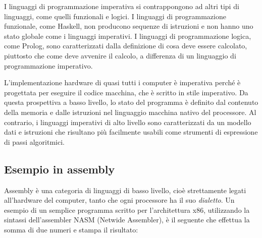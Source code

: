 \documentclass[
  letterpaper,
]{scrbook}
\begin{document}
I linguaggi di programmazione imperativa si contrappongono ad altri tipi
di linguaggi, come quelli funzionali e logici. I linguaggi di
programmazione funzionale, come Haskell, non producono sequenze di
istruzioni e non hanno uno stato globale come i linguaggi imperativi. I
linguaggi di programmazione logica, come Prolog, sono caratterizzati
dalla definizione di cosa deve essere calcolato, piuttosto che come deve
avvenire il calcolo, a differenza di un linguaggio di programmazione
imperativo.

L'implementazione hardware di quasi tutti i computer è imperativa perché
è progettata per eseguire il codice macchina, che è scritto in stile
imperativo. Da questa prospettiva a basso livello, lo stato del
programma è definito dal contenuto della memoria e dalle istruzioni nel
linguaggio macchina nativo del processore. Al contrario, i linguaggi
imperativi di alto livello sono caratterizzati da un modello dati e
istruzioni che risultano più facilmente usabili come strumenti di
espressione di passi algoritmici.

\subsection{Esempio in assembly}\label{esempio-in-assembly}

Assembly è una categoria di linguaggi di basso livello, cioè
strettamente legati all'hardware del computer, tanto che ogni processore
ha il suo \emph{dialetto}. Un esempio di un semplice programma scritto
per l'architettura x86, utilizzando la sintassi dell'assembler NASM
(Netwide Assembler), è il seguente che effettua la somma di due numeri e
stampa il risultato:
\end{document}
